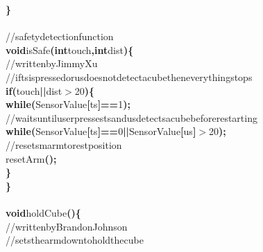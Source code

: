 \documentclass[a4paper, 10pt]{article}
\newcommand\SPC{\hspace*{0.6em}}
\newcommand\TAB{\hspace*{1.2em}}
\newcommand{\CppAComment}[1]{\textcolor[rgb]{0,0.5,0}{\colorbox[rgb]{1,1,1}{#1}}}
\newcommand{\CppAIdentifier}[1]{#1}
\newcommand{\CppANumber}[1]{\textcolor[rgb]{0,0,1}{\colorbox[rgb]{1,1,1}{#1}}}
\newcommand{\CppAReservedWord}[1]{\textbf{\colorbox[rgb]{1,1,1}{#1}}}
\newcommand{\CppASpace}[1]{\colorbox[rgb]{1,1,1}{#1}}
\newcommand{\CppASymbol}[1]{\textbf{\textcolor[rgb]{1,0,0}{\colorbox[rgb]{1,1,1}{#1}}}}
\begin{document}
\begin{ttfamily}
\CppASymbol{\}}\\
\\
\CppAComment{//safety\SPC detection\SPC function}\\
\CppAReservedWord{void}\CppASpace{\SPC }\CppAIdentifier{isSafe}\CppASpace{\SPC }\CppASymbol{(}\CppAReservedWord{int}\CppASpace{\SPC }\CppAIdentifier{touch}\CppASymbol{,}\CppASpace{\SPC }\CppAReservedWord{int}\CppASpace{\SPC }\CppAIdentifier{dist}\CppASymbol{)}\CppASymbol{\{}\\
\CppASpace{\TAB }\CppAComment{//\SPC written\SPC by\SPC Jimmy\SPC Xu}\\
\CppASpace{\TAB }\CppAComment{//\SPC if\SPC ts\SPC is\SPC pressed\SPC or\SPC us\SPC does\SPC not\SPC detect\SPC a\SPC cube\SPC then\SPC everything\SPC stops}\\
\CppASpace{\TAB }\CppAReservedWord{if}\CppASpace{\SPC }\CppASymbol{(}\CppAIdentifier{touch}\CppASymbol{||}\CppAIdentifier{dist}\CppASymbol{$>$}\CppANumber{20}\CppASymbol{)}\CppASymbol{\{}\\
\CppASpace{\TAB \TAB }\CppAReservedWord{while}\CppASymbol{(}\CppAIdentifier{SensorValue}\CppASymbol{[}\CppAIdentifier{ts}\CppASymbol{]}\CppASymbol{==}\CppANumber{1}\CppASymbol{)}\CppASymbol{;}\\
\CppASpace{\TAB \TAB }\CppAComment{//\SPC waits\SPC until\SPC user\SPC presses\SPC ts\SPC and\SPC us\SPC detects\SPC a\SPC cube\SPC before\SPC restarting}\\
\CppASpace{\TAB \TAB }\CppAReservedWord{while}\CppASymbol{(}\CppAIdentifier{SensorValue}\CppASymbol{[}\CppAIdentifier{ts}\CppASymbol{]}\CppASymbol{==}\CppANumber{0}\CppASymbol{||}\CppAIdentifier{SensorValue}\CppASymbol{[}\CppAIdentifier{us}\CppASymbol{]}\CppASymbol{$>$}\CppANumber{20}\CppASymbol{)}\CppASymbol{;}\\
\CppASpace{\TAB \TAB }\CppAComment{//\SPC resets\SPC marm\SPC to\SPC rest\SPC position}\\
\CppASpace{\TAB \TAB }\CppAIdentifier{resetArm}\CppASymbol{(}\CppASymbol{)}\CppASymbol{;}\\
\CppASpace{\TAB }\CppASymbol{\}}\\
\CppASymbol{\}}\\
\\
\CppAReservedWord{void}\CppASpace{\SPC }\CppAIdentifier{holdCube}\CppASymbol{(}\CppASymbol{)}\CppASymbol{\{}\\
\CppASpace{\TAB }\CppAComment{//\SPC written\SPC by\SPC Brandon\SPC Johnson}\\
\CppASpace{\TAB }\CppAComment{//\SPC sets\SPC the\SPC arm\SPC down\SPC to\SPC hold\SPC the\SPC cube}\\

\end{ttfamily}
\end{document}
